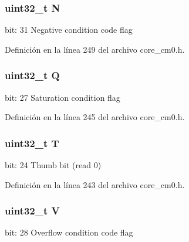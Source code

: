 \subsubsection[{\texorpdfstring{N}{N}}]{\setlength{\rightskip}{0pt plus 5cm}uint32\+\_\+t N}\hypertarget{unionx_p_s_r___type_abae0610bc2a97bbf7f689e953e0b451f}{}\label{unionx_p_s_r___type_abae0610bc2a97bbf7f689e953e0b451f}
bit\+: 31 Negative condition code flag 

Definición en la línea 249 del archivo core\+\_\+cm0.\+h.

\subsubsection[{\texorpdfstring{Q}{Q}}]{\setlength{\rightskip}{0pt plus 5cm}uint32\+\_\+t Q}\hypertarget{unionx_p_s_r___type_a65f27ddc4f7e09c14ce7c5211b2e000a}{}\label{unionx_p_s_r___type_a65f27ddc4f7e09c14ce7c5211b2e000a}
bit\+: 27 Saturation condition flag 

Definición en la línea 245 del archivo core\+\_\+cm0.\+h.

\subsubsection[{\texorpdfstring{T}{T}}]{\setlength{\rightskip}{0pt plus 5cm}uint32\+\_\+t T}\hypertarget{unionx_p_s_r___type_a6e1cf12e53a20224f6f62c001d9be972}{}\label{unionx_p_s_r___type_a6e1cf12e53a20224f6f62c001d9be972}
bit\+: 24 Thumb bit (read 0) 

Definición en la línea 243 del archivo core\+\_\+cm0.\+h.

\subsubsection[{\texorpdfstring{V}{V}}]{\setlength{\rightskip}{0pt plus 5cm}uint32\+\_\+t V}\hypertarget{unionx_p_s_r___type_acd4a2b64faee91e4a9eef300667fa222}{}\label{unionx_p_s_r___type_acd4a2b64faee91e4a9eef300667fa222}
bit\+: 28 Overflow condition code flag 

